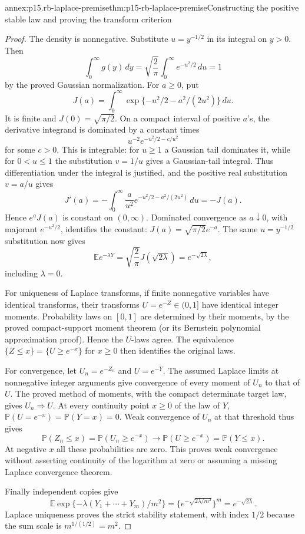 \begin{annexitem}{annex:p15.rb-laplace-premise}{thm:p15-rb-laplace-premise}{Constructing the positive stable law and proving the transform criterion}
\begin{proof}
The density is nonnegative. Substitute \(u=y^{-1/2}\)
in its integral on \(y>0\). Then
\[
 \int_0^\infty g(y)\,dy
       =\sqrt{\frac2\pi}\int_0^\infty e^{-u^2/2}\,du=1
 \]
by the proved Gaussian normalization.
For \(a\geq0\), put
\[
 J(a)=\int_0^\infty
              \exp\{-u^2/2-a^2/(2u^2)\}\,du.
 \]
It is finite and \(J(0)=\sqrt{\pi/2}\).
On a compact interval of positive \(a\)'s, the derivative
integrand is dominated by a constant times
\[
 u^{-2}e^{-u^2/2-c/u^2}
 \]
for some \(c>0\). This is integrable: for \(u\geq1\) a
Gaussian tail dominates it, while for \(0<u\leq1\) the
substitution \(v=1/u\) gives a Gaussian-tail integral.
Thus differentiation under the integral is justified, and
the positive real substitution \(v=a/u\) gives
\[
 J'(a)=-\int_0^\infty \frac a{u^2}
                 e^{-u^2/2-a^2/(2u^2)}\,du=-J(a).
 \]
Hence \(e^aJ(a)\) is constant on \((0,\infty)\).
Dominated convergence as \(a\downarrow0\), with majorant
\(e^{-u^2/2}\), identifies the constant:
\(J(a)=\sqrt{\pi/2}e^{-a}\).
The same \(u=y^{-1/2}\) substitution now gives
\[
 \mathbb Ee^{-\lambda Y}
    =\sqrt{\frac2\pi}J(\sqrt{2\lambda})
    =e^{-\sqrt{2\lambda}},
 \]
including \(\lambda=0\).

For uniqueness of Laplace transforms, if finite nonnegative
variables have identical transforms, their transforms
\(U=e^{-Z}\in(0,1]\) have identical integer moments.
Probability laws on \([0,1]\) are determined by their moments,
by the proved compact-support moment theorem (or its Bernstein
polynomial approximation proof). Hence the \(U\)-laws agree.
The equivalence \(\{Z\leq x\}=\{U\geq e^{-x}\}\) for \(x\geq0\)
then identifies the original laws.

For convergence, let \(U_n=e^{-Z_n}\) and \(U=e^{-Y}\).
The assumed Laplace limits at nonnegative integer arguments give
convergence of every moment of \(U_n\) to that of \(U\).
The proved method of moments, with the compact determinate
target law, gives \(U_n\Rightarrow U\).
At every continuity point \(x\geq0\) of the law of \(Y\),
\(\mathbb P(U=e^{-x})=\mathbb P(Y=x)=0\).
Weak convergence of \(U_n\) at that threshold thus gives
\[
 \mathbb P(Z_n\leq x)=\mathbb P(U_n\geq e^{-x})
                   \longrightarrow\mathbb P(U\geq e^{-x})
                   =\mathbb P(Y\leq x).
 \]
At negative \(x\) all these probabilities are zero.
This proves weak convergence without asserting continuity of
the logarithm at zero or assuming a missing Laplace convergence theorem.

Finally independent copies give
\[
 \mathbb E\exp\{-\lambda(Y_1+\cdots+Y_m)/m^2\}
    =\{e^{-\sqrt{2\lambda/m^2}}\}^m
    =e^{-\sqrt{2\lambda}}.
 \]
Laplace uniqueness proves the strict stability statement,
with index \(1/2\) because the sum scale is \(m^{1/(1/2)}=m^2\).
\end{proof}
\end{annexitem}

